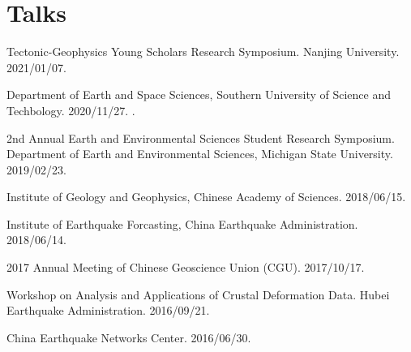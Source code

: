 \section*{Talks}

\begin{etaremune}
\item
	Tectonic-Geophysics Young Scholars Research Symposium.
	Nanjing University.
	2021/01/07.
\item
	Department of Earth and Space Sciences, Southern University of Science and Techbology.
	2020/11/27.
	\invited.
\item
    2nd Annual Earth and Environmental Sciences Student Research Symposium.
    Department of Earth and Environmental Sciences, Michigan State University.
    2019/02/23.
\item
    Institute of Geology and Geophysics, Chinese Academy of Sciences.
    2018/06/15.
    \invited
\item
    Institute of Earthquake Forcasting, China Earthquake Administration.
    2018/06/14.
\item
    2017 Annual Meeting of Chinese Geoscience Union (CGU).
    2017/10/17.
    \invited
\item
    Workshop on Analysis and Applications of Crustal Deformation Data.
    Hubei Earthquake Administration.
    2016/09/21.
    \invited
\item
    China Earthquake Networks Center.
    2016/06/30.
    \invited
\end{etaremune}

